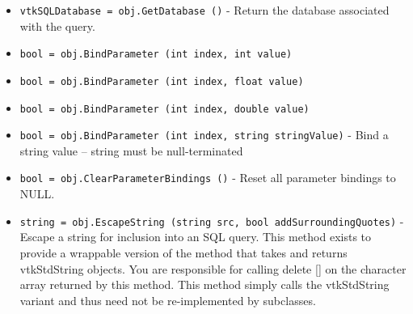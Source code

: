 \begin{itemize}
\item  \verb|vtkSQLDatabase = obj.GetDatabase ()| -  Return the database associated with the query.

\item  \verb|bool = obj.BindParameter (int index, int value)|

\item  \verb|bool = obj.BindParameter (int index, float value)|

\item  \verb|bool = obj.BindParameter (int index, double value)|

\item  \verb|bool = obj.BindParameter (int index, string stringValue)| -  Bind a string value -- string must be null-terminated

\item  \verb|bool = obj.ClearParameterBindings ()| -  Reset all parameter bindings to NULL.

\item  \verb|string = obj.EscapeString (string src, bool addSurroundingQuotes)| -  Escape a string for inclusion into an SQL query.
 This method exists to provide a wrappable version of
 the method that takes and returns vtkStdString objects.
 You are responsible for calling delete [] on the
 character array returned by this method.
 This method simply calls the vtkStdString variant and thus
 need not be re-implemented by subclasses.

\end{itemize}
